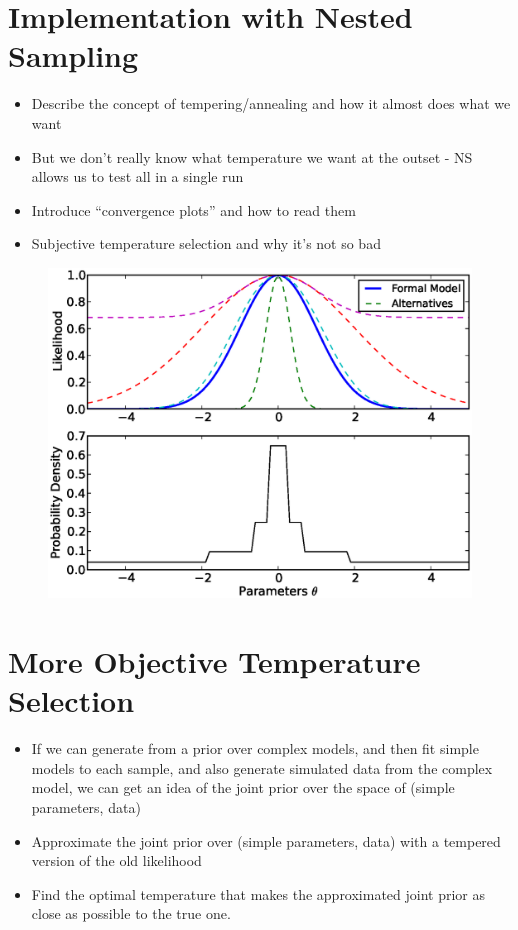 \documentclass[letterpaper, 11pt]{article}
\begin{document}
\begin{figure}
\begin{center}
\end{center}
\end{figure}

\section{Implementation with Nested Sampling}
\begin{itemize}
\item Describe the concept of tempering/annealing and how it almost does what we want \\
\item But we don't really know what temperature we want at the outset - NS allows us to test all in a single run
\item Introduce ``convergence plots'' and how to read them
\item Subjective temperature selection and why it's not so bad
\end{itemize}

\begin{figure}
\begin{center}
\includegraphics[scale=0.7]{nested.eps}
\end{center}
\end{figure}

\section{More Objective Temperature Selection}
\begin{itemize}
\item If we can generate from a prior over complex models, and then fit simple models to each sample, and also generate simulated data from the complex model, we can get an idea of the joint prior over the space of (simple parameters, data)\\
\item Approximate the joint prior over (simple parameters, data) with a tempered version of the old likelihood \\
\item Find the optimal temperature that makes the approximated joint prior as close as possible to the true one.
\end{itemize}
\end{document}

